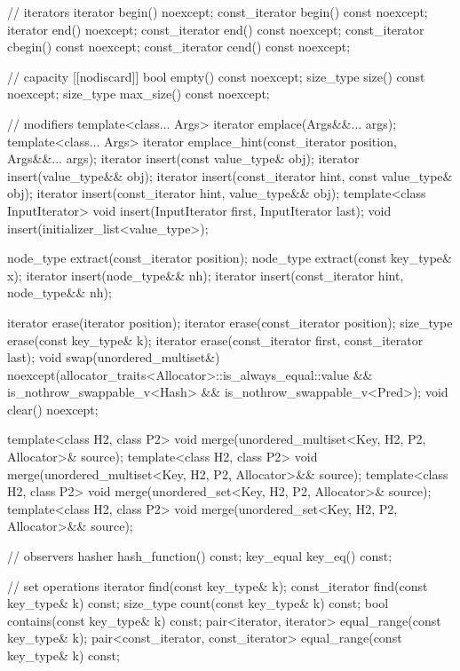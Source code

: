 \begin{codeblock}
{{    // iterators
    iterator       begin() noexcept;
    const_iterator begin() const noexcept;
    iterator       end() noexcept;
    const_iterator end() const noexcept;
    const_iterator cbegin() const noexcept;
    const_iterator cend() const noexcept;

    // capacity
    [[nodiscard]] bool empty() const noexcept;
    size_type size() const noexcept;
    size_type max_size() const noexcept;

    // modifiers
    template<class... Args> iterator emplace(Args&&... args);
    template<class... Args> iterator emplace_hint(const_iterator position, Args&&... args);
    iterator insert(const value_type& obj);
    iterator insert(value_type&& obj);
    iterator insert(const_iterator hint, const value_type& obj);
    iterator insert(const_iterator hint, value_type&& obj);
    template<class InputIterator> void insert(InputIterator first, InputIterator last);
    void insert(initializer_list<value_type>);

    node_type extract(const_iterator position);
    node_type extract(const key_type& x);
    iterator insert(node_type&& nh);
    iterator insert(const_iterator hint, node_type&& nh);

    iterator  erase(iterator position);
    iterator  erase(const_iterator position);
    size_type erase(const key_type& k);
    iterator  erase(const_iterator first, const_iterator last);
    void      swap(unordered_multiset&)
      noexcept(allocator_traits<Allocator>::is_always_equal::value &&
               is_nothrow_swappable_v<Hash> &&
               is_nothrow_swappable_v<Pred>);
    void      clear() noexcept;

    template<class H2, class P2>
      void merge(unordered_multiset<Key, H2, P2, Allocator>& source);
    template<class H2, class P2>
      void merge(unordered_multiset<Key, H2, P2, Allocator>&& source);
    template<class H2, class P2>
      void merge(unordered_set<Key, H2, P2, Allocator>& source);
    template<class H2, class P2>
      void merge(unordered_set<Key, H2, P2, Allocator>&& source);

    // observers
    hasher hash_function() const;
    key_equal key_eq() const;

    // set operations
    iterator       find(const key_type& k);
    const_iterator find(const key_type& k) const;
    size_type      count(const key_type& k) const;
    bool           contains(const key_type& k) const;
    pair<iterator, iterator>             equal_range(const key_type& k);
    pair<const_iterator, const_iterator> equal_range(const key_type& k) const;

}}
\end{codeblock}
